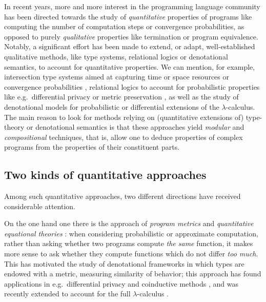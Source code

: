 
In recent years, more and more interest in the programming language community has been directed towards the study of \emph{quantitative} properties of programs like computing the number of computation steps or convergence probabilities, 
as opposed to purely \emph{qualitative} properties like termination or program equivalence. 
Notably, a significant effort has been made to extend, or adapt, well-established qualitative methods, like type systems, relational logics or denotational semantics, to account for quantitative properties. We can mention, for example, 
intersection type systems aimed at capturing time or space resources \cite{decarvalho2018, Accattoli2022} or convergence probabilities \cite{Breuvart2018, PistoneLICS2022},  relational logics to account for probabilistic properties like e.g.~differential privacy \cite{Barthe_2012} or metric preservation \cite{Reed2010, dallago}, as well as the study of denotational models for 
probabilistic \cite{Ehrhard2011, Staton2017} or differential \cite{difflambda} extensions of the $\lambda$-calculus. 
The main reason to look for methods relying on (quantitative extensions of) type-theory or denotational semantics is that these approaches yield \emph{modular} and \emph{compositional} techniques, that is, allow one to deduce properties of complex programs from the properties of their constituent parts.   

\subsection{Two kinds of quantitative approaches}

Among such quantitative approaches, two different directions have received considerable attention. 

On the one hand one there is the approach of \emph{program metrics} \cite{Reed2010, Gaboardi2017, Gabo2019} and \emph{quantitative equational theories} \cite{Plotk}: when considering probabilistic or approximate computation, rather than asking whether two programs compute \emph{the same} function, it makes more sense to ask   whether they compute functions which do not differ \emph{too much}. This has motivated the study of denotational frameworks in which types are endowed with a metric, measuring similarity of behavior; this approach has found  applications in e.g.~differential privacy \cite{Reed2010} and coinductive methods \cite{Bonchi2018}, and was recently extended to account for the full $\lambda$-calculus \cite{Geoffroy2020, PistoneLICS, PistoneFSCD2022}.

